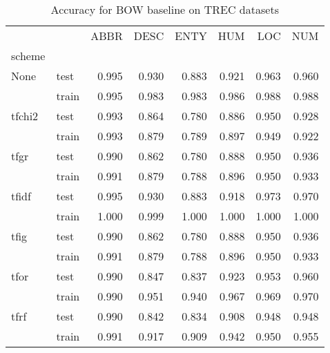 \begin{table}[h]
\begin{center}

\begin{tabular}{llrrrrrr}
\toprule
{} &&  ABBR &  DESC &  ENTY &  HUM &  LOC &  NUM \\
scheme &  & & & &&&\\
\midrule
None & test & 0.995 & 0.930 & 0.883 &0.921 &0.963 &0.960 \\
{} & train & 0.995 & 0.983 & 0.983 &0.986 &0.988 &0.988 \\
tfchi2 & test & 0.993 & 0.864 & 0.780 &0.886 &0.950 &0.928 \\
{} & train & 0.993 & 0.879 & 0.789 &0.897 &0.949 &0.922 \\
tfgr & test & 0.990 & 0.862 & 0.780 &0.888 &0.950 &0.936 \\
{} & train & 0.991 & 0.879 & 0.788 &0.896 &0.950 &0.933 \\
tfidf & test & 0.995 & 0.930 & 0.883 &0.918 &0.973 &0.970 \\
{} & train & 1.000 & 0.999 & 1.000 &1.000 &1.000 &1.000 \\
tfig & test & 0.990 & 0.862 & 0.780 &0.888 &0.950 &0.936 \\
{} & train & 0.991 & 0.879 & 0.788 &0.896 &0.950 &0.933 \\
tfor & test & 0.990 & 0.847 & 0.837 &0.923 &0.953 &0.960 \\
{} & train & 0.990 & 0.951 & 0.940 &0.967 &0.969 &0.970 \\
tfrf & test & 0.990 & 0.842 & 0.834 &0.908 &0.948 &0.948 \\
{} & train & 0.991 & 0.917 & 0.909 &0.942 &0.950 &0.955 \\
\bottomrule
\end{tabular}

\caption[Accuracy for BOW baseline on TREC datasets]{Accuracy for BOW baseline on TREC datasets}
\label{tab:}
\end{center}
\end{table}

